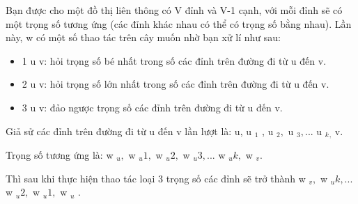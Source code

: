 Bạn được cho một đồ thị liên thông có V đỉnh và V-1 cạnh, với mỗi đỉnh sẽ có một trọng số tương ứng (các đỉnh khác nhau có thể có trọng số bằng nhau). Lần này, w có một số thao tác trên cây muốn nhờ bạn xử lí như sau:
\begin{itemize}
	\item 1 u v: hỏi trọng số bé nhất trong số các đỉnh trên đường đi từ u đến v.
	\item 2 u v: hỏi trọng số lớn nhất trong số các đỉnh trên đường đi từ u đến v.
	\item 3 u v: đảo ngược trọng số các đỉnh trên đường đi từ u đến v.
\end{itemize}

Giả sử các đỉnh trên đường đi từ u đến v lần lượt là: u, u $_ 1 $ , u $_ 2, $ u $_ 3,... $ u $_ k $$_ , $ v.

Trọng số tương ứng là: w $_ u, $ w $_ u1, $ w $_ u2, $ w $_ u3,... $ w $_ uk, $ w $_ v. $

Thì sau khi thực hiện thao tác loại 3 trọng số các đỉnh sẽ trở thành w $_ v, $ w $_ uk,... $ w $_ u2, $ w $_ u1, $ w $_ u $ .